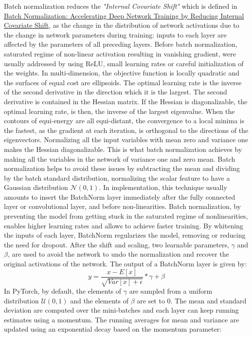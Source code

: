 \documentclass[11pt]{article}
\newcommand{\0}{\mat{0}}
\begin{document}
\begin{itemize}
    Batch normalization reduces the \textit{"Internal Covariate Shift"} which is defined in \href{https://arxiv.org/abs/1502.03167}{Batch Normalization: Accelerating Deep Network Training by Reducing Internal Covariate Shift}, as the change in the distribution of network activations due to the change in network parameters during training: inputs to each layer are affected by the parameters of all preceding layers. Before batch normalization, saturated regime of non-linear activation resulting in vanishing gradient, were usually addressed by using ReLU, small learning rates or careful initialization of the weights.  In multi-dimension, the objective function is locally quadratic and the surfaces of equal cost are ellipsoids.  The optimal learning rate is  the inverse of the second derivative in the direction which it is the largest. The second derivative is contained in the Hessian matrix. If the Hessian is diagonalizable,  the optimal learning rate, is then, the inverse of the largest eigenvalue. When the contours of equi-energy are all equi-distant, the convergence to a local minima is the fastest, as the gradient at each iteration, is orthogonal to the directions of the eigenvectors. Normalizing all the input variables with mean zero and variance one makes the Hessian diagonalizable. This is what batch normalization achieves by making all the variables in the network of variance one and zero mean. Batch normalization helps to avoid these issues by subtracting the mean and dividing by the batch standard distribution, normalizing the scalar feature to have a Gaussian distribution $\mathcal{N}(0,1)$.  In implementation, this technique usually amounts to insert the BatchNorm layer immediately after the fully connected layer or convolutional layer, and before non-linearities. Batch normalization, by preventing the model from getting stuck in the saturated regime of nonlinearities, enables higher learning rates and allows to achieve faster training. By whitening the inputs of  each layer, BatchNorm regularizes the model, removing or reducing the need for dropout. After the shift and scaling, two learnable parameters, $\gamma$ and $\beta$, are used to avoid the network to undo the normalization and recover the original activations  of the network. The output of a BatchNorm layer is given by:
    	\[
    		y =\frac{x-E[x]} {\sqrt{Var[x]+\epsilon}} * \gamma + \beta
    	\]
	In PyTorch,  by default, the elements of $\gamma$ are sampled from a uniform distribution $\mathcal{U}(0,1)$ and the elements of $\beta$ are set to 0. The mean and standard deviation are computed over the mini-batches and each layer can keep running estimates using a momentum. The running averages for mean and variance are updated using an exponential decay based on the momentum parameter:

\end{itemize}
\end{document}

